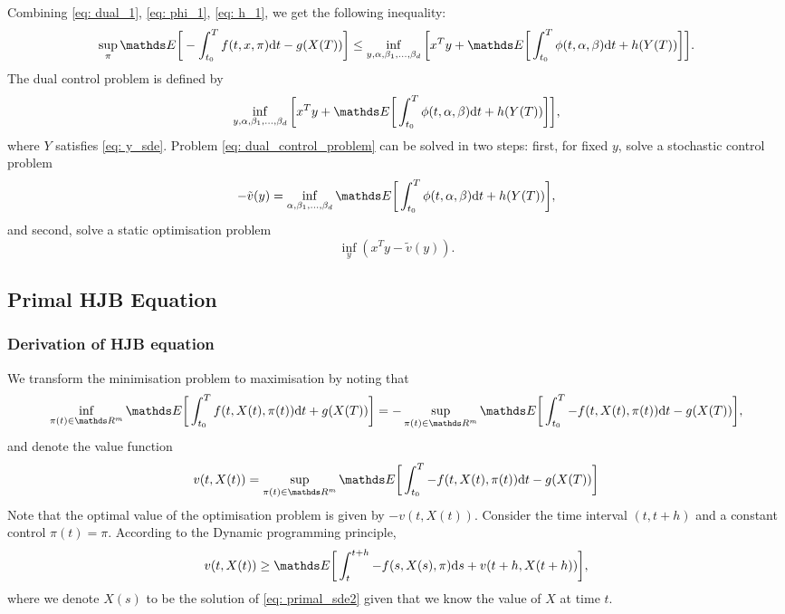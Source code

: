 Combining \eqref{eq: dual_1}, \eqref{eq: phi_1}, \eqref{eq: h_1}, we get the following inequality:
\begin{equation}
    \sup_\pi \E \bigg[ -\int_{t_0}^T f(t,x,\pi) \d t - g(X(T)) \bigg] \le \inf_{y, \alpha, \beta_1, \dots, \beta_d} \bigg[ x^T y + \E\bigg[\int_{t_0}^T \phi(t,\alpha, \beta ) \d t + h(Y(T)) \bigg] \bigg]. \label{eq: dual_primal_inequality}
\end{equation}
The dual control problem is defined by
\begin{equation}
    \inf_{y, \alpha, \beta_1, \dots, \beta_d} \bigg[ x^T y + \E\bigg[\int_{t_0}^T \phi(t,\alpha, \beta ) \d t + h(Y(T)) \bigg] \bigg], \label{eq: dual_control_problem}
\end{equation}
where $Y$ satisfies \eqref{eq: y_sde}. Problem \eqref{eq: dual_control_problem} can be solved in two steps: first, for fixed $y$, solve a stochastic control problem
\begin{equation}
    - \tilde{v}(y) = \inf_{ \alpha, \beta_1, \dots, \beta_d} \E\bigg[\int_{t_0}^T \phi (t, \alpha, \beta) \d t + h(Y(T)) \bigg], \label{eq: dual_value_function}
\end{equation}
and second, solve a static optimisation problem
\begin{equation*}
    \inf_y (x^T y - \tilde{v}(y)).
\end{equation*}
\newpage
\subsection{Primal HJB Equation}

\subsubsection{Derivation of HJB equation}
We transform the minimisation problem to maximisation by noting that
\begin{equation*}
     \inf_{\pi(t) \in \R^m} \E \bigg[ \int_{t_0}^T f(t, X(t), \pi(t)) \d t + g(X(T))\bigg] = - \sup_{\pi(t) \in \R^m} \E \bigg[ \int_{t_0}^T - f(t, X(t), \pi(t)) \d t - g(X(T))\bigg],
\end{equation*}
and denote the value function 
\begin{equation}
    v(t, X(t)) = \sup_{\pi(t) \in \R^m} \E \bigg[ \int_{t_0}^T - f(t, X(t), \pi(t)) \d t - g(X(T))\bigg]
\end{equation}
Note that the optimal value of the optimisation problem is given by $-v(t,X(t))$. Consider the time interval $(t, t + h)$ and a constant control $\pi(t) = \pi$. According to the Dynamic programming principle,
\begin{equation}
    v(t, X(t)) \ge \E \bigg[ \int_{t}^{t+h} - f(s, X(s), \pi) \d s + v(t+h, X(t + h)) \bigg],
    \label{eq: 1}
\end{equation}
where we denote $X(s)$ to be the solution of \eqref{eq: primal_sde2} given that we know the value of $X$ at time $t$.\\

